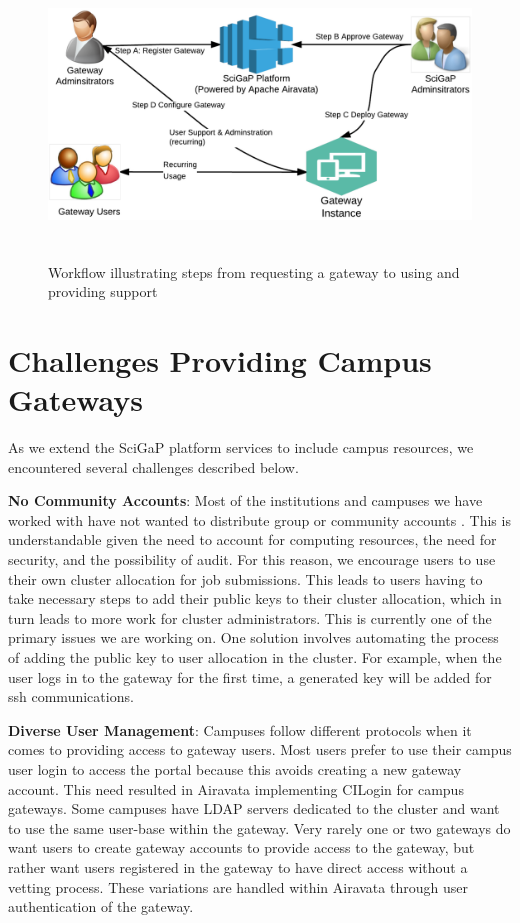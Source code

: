 \documentclass[sigconf]{acmart}
\begin{document}
\begin{figure}
\includegraphics[height=3in, width=6in]{figures/gateway-approvals.pdf}
\caption{Workflow illustrating steps from requesting a gateway to using and providing support}
\end{figure}

\section{Challenges Providing Campus Gateways}
As we extend the SciGaP platform services to include campus resources, we encountered several challenges described below.

\noindent\textbf{No Community Accounts}: Most of the institutions and campuses we have worked with have not wanted to distribute group or community accounts \cite{welch2007aaaa}. This is understandable given the need to account for computing resources, the need for security, and the possibility of audit. For this reason, we encourage users to use their own cluster allocation for job submissions. This leads to users having to take necessary steps to add their public keys to their cluster allocation, which in turn leads to more work for cluster administrators.  This is currently one of the primary issues we are working on. One solution involves automating the process of adding the public key to user allocation in the cluster.  For example,  when the user logs in to the gateway for the first time, a generated key will be added for ssh communications.

\noindent\textbf{Diverse User Management}: Campuses follow different protocols when it comes to providing access to gateway users. Most users prefer to use their campus user login to access the portal because this avoids creating a new gateway account. This need resulted in Airavata implementing CILogin for campus gateways. Some campuses have LDAP servers dedicated to the cluster and want to use the same user-base within the gateway. Very rarely one or two gateways do want users to create gateway accounts to  provide access to the gateway, but rather want users registered in the gateway to have direct access without a vetting process. These variations are handled within Airavata through user authentication of the gateway.
\end{document}
